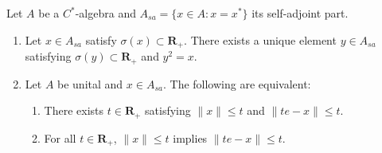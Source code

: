 \begin{lemma}\label{lem:positive-square-root}
Let $A$ be a $C^*$-algebra and $A_{sa} = \{x \in A : x = x^*\}$ its self-adjoint part.
\begin{enumerate}
\item[(a)] Let $x \in A_{sa}$ satisfy $\sigma(x) \subset \mathbf{R}_+$. There exists a unique element $y \in A_{sa}$ satisfying $\sigma(y) \subset \mathbf{R}_+$ and $y^2 = x$.
\item[(b)] Let $A$ be unital and $x \in A_{sa}$. The following are equivalent:
\begin{enumerate}
\item[(i)] There exists $t \in \mathbf{R}_+$ satisfying $\|x\| \leq t$ and $\|te - x\| \leq t$.
\item[(ii)] For all $t \in \mathbf{R}_+$, $\|x\| \leq t$ implies $\|te - x\| \leq t$.
\end{enumerate}
\end{enumerate}
\end{lemma}
